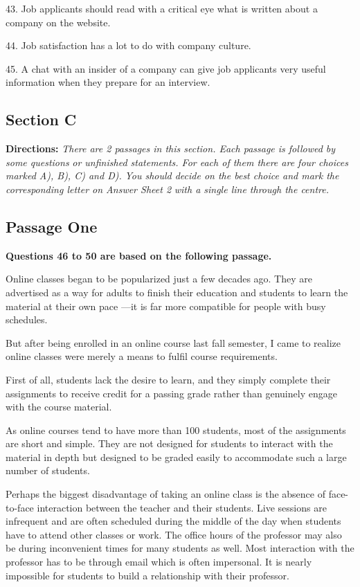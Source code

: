 \documentclass[UTF8,11pt]{ctexart}
\begin{document}
43. Job applicants should read with a critical eye what is written about a company on the website.


44. Job satisfaction has a lot to do with company culture.


45. A chat with an insider of a company can give job applicants very useful information when they prepare for an interview.


\subsection*{\textbf{Section C}}


\textbf{Directions: }\textit{There are 2 passages in this section. Each passage is followed by some questions} \textit{or unfinished statements. For each of them there are four choices marked A), B), C) and D).} \textit{You should decide on the best choice and mark the corresponding letter on Answer Sheet 2} \textit{with a single line through the centre.}


\subsection*{\textbf{Passage One}}


\textbf{Questions 46 to 50 are based on the following passage.}


Online classes began to be popularized just a few decades ago. They are advertised as a way for adults to finish their education and students to learn the material at their own pace —it is far more compatible for people with busy schedules.


But after being enrolled in an online course last fall semester, I came to realize online classes were merely a means to fulfil course requirements.


First of all, students lack the desire to learn, and they simply complete their assignments to receive credit for a passing grade rather than genuinely engage with the course material.


As online courses tend to have more than 100 students, most of the assignments are short and simple. They are not designed for students to interact with the material in depth but designed to be graded easily to accommodate such a large number of students.


Perhaps the biggest disadvantage of taking an online class is the absence of face-to-face interaction between the teacher and their students. Live sessions are infrequent and are often scheduled during the middle of the day when students have to attend other classes or work. The office hours of the professor may also be during inconvenient times for many students as well. Most interaction with the professor has to be through email which is often impersonal. It is nearly impossible for students to build a relationship with their professor.
\end{document}
